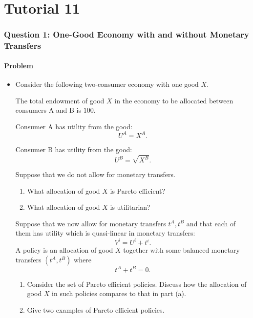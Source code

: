 \documentclass[12pt]{article}
\begin{document}
\newpage
\part{Tutorial 11}
\section{Question 1: One-Good Economy with and without Monetary Transfers}

\subsection{Problem}
\begin{itemize}
    \item Consider the following two-consumer economy with one good \(X\).

    The total endowment of good \(X\) in the economy to be allocated between consumers A and B is \(100\).

    Consumer A has utility from the good:
    \[
    U^A=X^A.
    \]

    Consumer B has utility from the good:
    \[
    U^B=\sqrt{X^B}.
    \]

    Suppose that we do not allow for monetary transfers.

    \begin{enumerate}[label=(\alph*)]
        \item What allocation of good \(X\) is Pareto efficient?
        \item What allocation of good \(X\) is utilitarian?
    \end{enumerate}

    Suppose that we now allow for monetary transfers \(t^A,t^B\) and that each of them has utility which is quasi-linear in monetary transfers:
    \[
    V^i=U^i+t^i.
    \]
    A policy is an allocation of good \(X\) together with some balanced monetary transfers \((t^A,t^B)\) where
    \[
    t^A+t^B=0.
    \]

    \begin{enumerate}[label=(\alph*),resume]
        \item Consider the set of Pareto efficient policies. Discuss how the allocation of good \(X\) in such policies compares to that in part (a).
        \item Give two examples of Pareto efficient policies.
    \end{enumerate}
\end{itemize}
\end{document}
